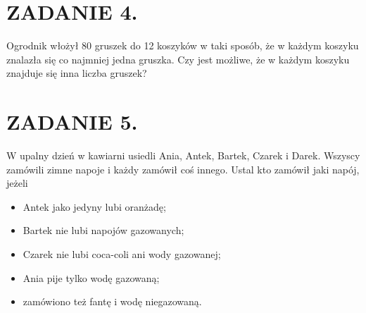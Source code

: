 \documentclass[10pt]{article}
\begin{document}
\section*{ZADANIE 4.}
Ogrodnik włożył 80 gruszek do 12 koszyków w taki sposób, że w każdym koszyku znalazła się co najmniej jedna gruszka. Czy jest możliwe, że w każdym koszyku znajduje się inna liczba gruszek?

\section*{ZADANIE 5.}
W upalny dzień w kawiarni usiedli Ania, Antek, Bartek, Czarek i Darek. Wszyscy zamówili zimne napoje i każdy zamówił coś innego. Ustal kto zamówił jaki napój, jeżeli

\begin{itemize}
  \item Antek jako jedyny lubi oranżadę;
  \item Bartek nie lubi napojów gazowanych;
  \item Czarek nie lubi coca-coli ani wody gazowanej;
  \item Ania pije tylko wodę gazowaną;
  \item zamówiono też fantę i wodę niegazowaną.
\end{itemize}
\end{document}
